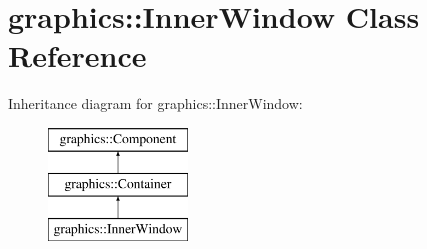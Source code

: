 \hypertarget{classgraphics_1_1_inner_window}{\section{graphics\-:\-:Inner\-Window Class Reference}
\label{classgraphics_1_1_inner_window}
}
Inheritance diagram for graphics\-:\-:Inner\-Window\-:\begin{figure}[H]
\begin{center}
\leavevmode
\includegraphics[height=3.000000cm]{classgraphics_1_1_inner_window}
\end{center}
\end{figure}
